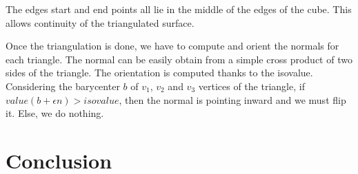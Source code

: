 \documentclass[12pt]{article}
\begin{document}
The edges start and end points all lie in the middle of the edges of the cube. This allows continuity of the triangulated surface.

Once the triangulation is done, we have to compute and orient the normals for each triangle. The normal can be easily obtain from a simple cross product of two sides of the triangle. The orientation is computed thanks to the isovalue. Considering the barycenter $b$ of $v_1$, $v_2$ and $v_3$ vertices of the triangle, if $value(b + \epsilon n) > isovalue$, then the normal is pointing inward and we must flip it. Else, we do nothing.


\newpage
\section*{Conclusion}


\newpage
{}


\end{document}
